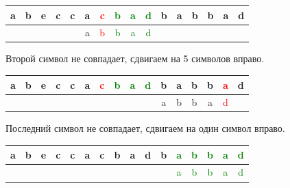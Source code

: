 \documentclass[12pt]{report}
\begin{document}
\begin{table}[h!]
		\begin{tabular}{| c | c | c | c | c | c | c | c | c | c | c | c | c | c | c | c |}
	 	\hline
		a & b & e & c & c & a & \textcolor{red}{c} & \textcolor{green}{b} & \textcolor{green}{a} & \textcolor{green}{d} & b & a & b & b & a & d \\ \hline
     &  &  &  & & a & \textcolor{red}{b} & \textcolor{green}{b} & \textcolor{green}{a} & \textcolor{green}{d} & & & & & & \\ \hline
		\end{tabular}
\end{table}

Второй символ не совпадает, сдвигаем на 5 символов вправо.

\begin{table}[h!]
		\begin{tabular}{| c | c | c | c | c | c | c | c | c | c | c | c | c | c | c | c |}
	 	\hline
		a & b & e & c & c & a & \textcolor{red}{c} & \textcolor{green}{b} & \textcolor{green}{a} & \textcolor{green}{d} & b & a & b & b & \textcolor{red}{a} & d \\ \hline
     &  &  &  &  &  &  &  &  &  & a & b & b & a & \textcolor{red}{d} & \\ \hline
		\end{tabular}
\end{table}

Последний символ не совпадает, сдвигаем на один символ вправо.

\begin{table}[h!]
		\begin{tabular}{| c | c | c | c | c | c | c | c | c | c | c | c | c | c | c | c |}
	 	\hline
		a & b & e & c & c & a & c & b & a & d & b & \textcolor{green}{a} & \textcolor{green}{b} & \textcolor{green}{b} & \textcolor{green}{a} & \textcolor{green}{d} \\ \hline
     &  &  &  &  &  &  &  &  &  &  & \textcolor{green}{a} & \textcolor{green}{b} & \textcolor{green}{b} & \textcolor{green}{a} & \textcolor{green}{d} \\ \hline
		\end{tabular}
\end{table}
\end{document}
